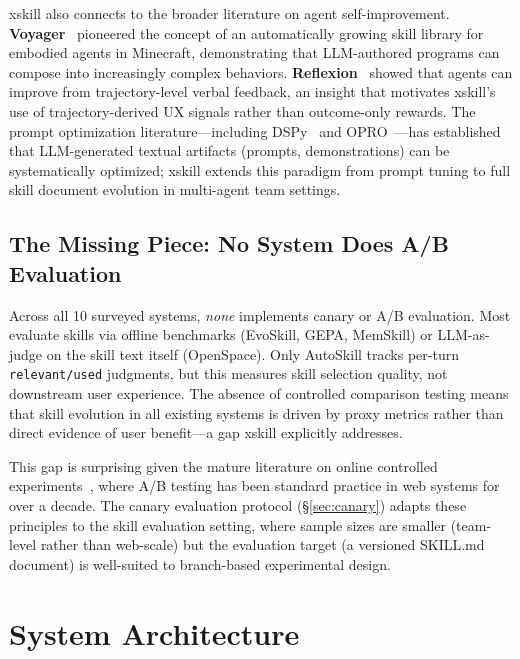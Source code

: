 \documentclass[11pt]{article}
\begin{document}
xskill also connects to the broader literature on agent self-improvement. \textbf{Voyager}~\citep{wang2023voyager} pioneered the concept of an automatically growing skill library for embodied agents in Minecraft, demonstrating that LLM-authored programs can compose into increasingly complex behaviors. \textbf{Reflexion}~\citep{shinn2023reflexion} showed that agents can improve from trajectory-level verbal feedback, an insight that motivates xskill's use of trajectory-derived UX signals rather than outcome-only rewards. The prompt optimization literature---including DSPy~\citep{khattab2023dspy} and OPRO~\citep{yang2024opro}---has established that LLM-generated textual artifacts (prompts, demonstrations) can be systematically optimized; xskill extends this paradigm from prompt tuning to full skill document evolution in multi-agent team settings.

\subsection{The Missing Piece: No System Does A/B Evaluation}

Across all 10 surveyed systems, \emph{none} implements canary or A/B evaluation. Most evaluate skills via offline benchmarks (EvoSkill, GEPA, MemSkill) or LLM-as-judge on the skill text itself (OpenSpace). Only AutoSkill tracks per-turn \texttt{relevant/used} judgments, but this measures skill selection quality, not downstream user experience. The absence of controlled comparison testing means that skill evolution in all existing systems is driven by proxy metrics rather than direct evidence of user benefit---a gap xskill explicitly addresses.

This gap is surprising given the mature literature on online controlled experiments~\citep{kohavi2013online, kohavi2020trustworthy}, where A/B testing has been standard practice in web systems for over a decade. The canary evaluation protocol (\S\ref{sec:canary}) adapts these principles to the skill evaluation setting, where sample sizes are smaller (team-level rather than web-scale) but the evaluation target (a versioned SKILL.md document) is well-suited to branch-based experimental design.


\section{System Architecture}
\label{sec:architecture}
\end{document}
